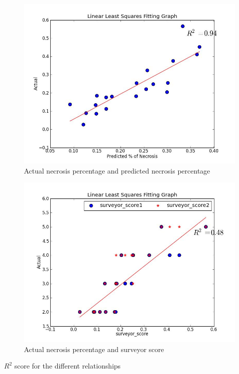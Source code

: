 \documentclass[conference]{IEEEtran}
\begin{document}
{{\begin{figure}[t!]
\centering
\includegraphics[scale=0.25]{images/Actual_Predicted.jpg}
\caption{Actual necrosis percentage and predicted necrosis percentage}
\label{fig:Relatio2}
\end{figure}

\begin{figure}[t!]
\centering
\includegraphics[scale=0.25]{images/Actual_surveyor.jpg}
\caption{ Actual necrosis percentage and surveyor score }
\label{fig:Relatio3}
\end{figure}


\begin{table}[t!]
\renewcommand{\arraystretch}{1.3}
\caption{$R^{2}$ score for the different relationships }


\end{table}}}
\end{document}
